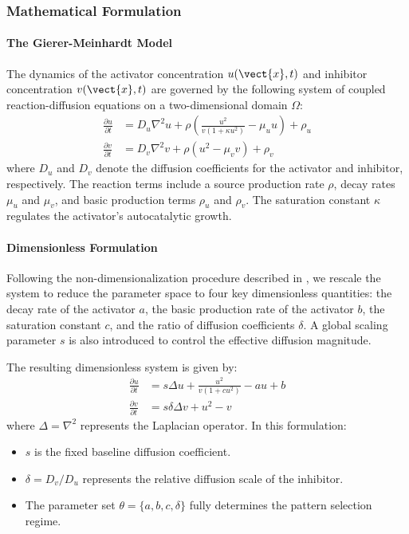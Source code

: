 \documentclass{article} %
\begin{document}
\subsubsection{Mathematical Formulation}

\paragraph{The Gierer-Meinhardt Model}\cite{gierer1972theory}
The dynamics of the activator concentration $u(\vect{x}, t)$ and inhibitor concentration $v(\vect{x}, t)$ are governed by the following system of coupled reaction-diffusion equations on a two-dimensional domain $\Omega$:
\begin{align}
    \frac{\partial u}{\partial t} &= D_u \nabla^2 u + \rho \left( \frac{u^2}{v(1 + \kappa u^2)} - \mu_u u \right) + \rho_u \label{eq:gm_u} \\
    \frac{\partial v}{\partial t} &= D_v \nabla^2 v + \rho \left( u^2 - \mu_v v \right) + \rho_v \label{eq:gm_v}
\end{align}
where $D_u$ and $D_v$ denote the diffusion coefficients for the activator and inhibitor, respectively. The reaction terms include a source production rate $\rho$, decay rates $\mu_u$ and $\mu_v$, and basic production terms $\rho_u$ and $\rho_v$. The saturation constant $\kappa$ regulates the activator's autocatalytic growth.

\paragraph{Dimensionless Formulation}

Following the non-dimensionalization procedure described in \cite{murray1982parameter}, we rescale the system to reduce the parameter space to four key dimensionless quantities: the decay rate of the activator $a$, the basic production rate of the activator $b$, the saturation constant $c$, and the ratio of diffusion coefficients $\delta$. A global scaling parameter $s$ is also introduced to control the effective diffusion magnitude.

The resulting dimensionless system is given by:
\begin{align}
    \frac{\partial u}{\partial t} &= s \Delta u + \frac{u^2}{v(1 + c u^2)} - a u + b \label{eq:dimless_u} \\
    \frac{\partial v}{\partial t} &= s \delta \Delta v + u^2 - v \label{eq:dimless_v}
\end{align}
where $\Delta = \nabla^2$ represents the Laplacian operator. In this formulation:
\begin{itemize}
    \item $s$ is the fixed baseline diffusion coefficient.
    \item $\delta = D_v / D_u$ represents the relative diffusion scale of the inhibitor.
    \item The parameter set $\theta = \{a, b, c, \delta\}$ fully determines the pattern selection regime.
\end{itemize}
\end{document}
